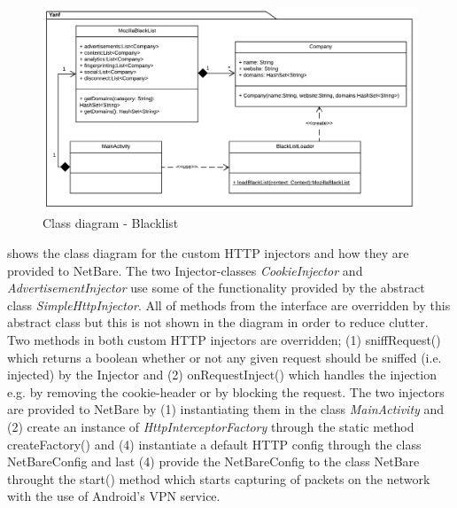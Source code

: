 \documentclass[main.tex]{subfiles}
\begin{document}
\begin{figure}[H]
    \centering
    \includegraphics[width=1\textwidth]{Images/Diagrams/Class-diagram-BlackList-concept.png}
    \caption{Class diagram - Blacklist}
    \label{fig:modview-blacklist}
\end{figure}

 shows the class diagram for the custom HTTP injectors and how they are provided to NetBare. The two Injector-classes \textit{CookieInjector} and \textit{AdvertisementInjector} use some of the functionality provided by the abstract class \textit{SimpleHttpInjector}. All of methods from the interface are overridden by this abstract class but this is not shown in the diagram in order to reduce clutter. Two methods in both custom HTTP injectors are overridden; (1) sniffRequest() which returns a boolean whether or not any given request should be sniffed (i.e. injected) by the Injector and (2) onRequestInject() which handles the injection e.g. by removing the cookie-header or by blocking the request. The two injectors are provided to NetBare by (1) instantiating them in the class \textit{MainActivity} and (2) create an instance of \textit{HttpInterceptorFactory} through the static method createFactory() and (4) instantiate a default HTTP config through the class NetBareConfig and last (4) provide the NetBareConfig to the class NetBare throught the start() method which starts capturing of packets on the network with the use of Android's VPN service.
\end{document}
